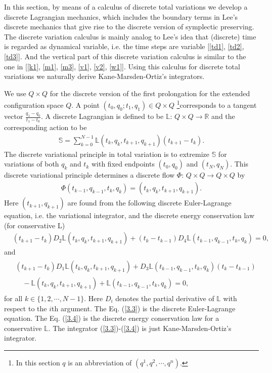 \documentclass[a4paper,a4paper]{article}
\begin{document}
 In this section, by means of a calculus of discrete total variations we develop
 a discrete Lagrangian mechanics, which includes the boundary terms in Lee's
discrete mechanics that give rise to the discrete version of
symplectic preserving. The discrete variation calculus is mainly
analog to Lee's idea that (discrete) time is regarded as dynamical
variable, i.e. the time steps are variable [\ref{td1}, \ref{td2},
\ref{td3}]. And the vertical part of this discrete variation
calculus is similar to the one in [\ref{k1}, \ref{m1}, \ref{m3},
\ref{v1}, \ref{v2}, \ref{w1}]. %
Using this calculus
for discrete total  variations
we  naturally derive
 Kane-Marsden-Ortiz's integrators.

 We use $Q \times Q$ for the discrete version
of the first prolongation for the extended configuration space
$Q$. A point $(t_{0}, q_{0}; t_{1}, q_{1})\in Q\times Q$
{\footnote{In this section $q$ is an abbreviation of
$(q^{1}, q^{2}, \cdots, q^{n})$.}}corresponds to a tangent vector
$\frac{q_{1}-q_{0}}{t_{1}-t_{0}}$. A discrete Lagrangian is
defined to be $\mathbb{L}:\,Q\times Q\to \mathbb{R}$ and the
corresponding action to be
\begin{align}
 \mathbb{S}=\sum_{k=0}^{N-1}\mathbb{L}(t_{k}, q_{k}, t_{k+1}, q_{k+1})
   (t_{k+1}-t_{k}). \label{3.1}
\end{align}
The discrete variational principle in total variation  is to
extremize $\mathbb{S}$ for variations of both $q_{k}$ and $t_{k}$
with  fixed endpoints $(t_{0}, q_{0})$ and $(t_{N}, q_{N})$. This
discrete variational principle  determines a discrete flow
$\Phi:\,Q\times Q\to Q\times Q$ by
\begin{align}
   \Phi(t_{k-1}, q_{k-1}, t_{k}, q_{k})=(t_{k}, q_{k},t_{k+1}, q_{k+1}). \label{3.2}
\end{align}
Here $(t_{k+1}, q_{k+1})$ are found from the following discrete
Euler-Lagrange equation, i.e. the variational integrator, and the
discrete energy conservation law (for conservative L)
\begin{align}
 &(t_{k+1}-t_{k})D_{2}\mathbb{L}(t_{k}, q_{k}, t_{k+1}, q_{k+1})
  +(t_{k}-t_{k-1})D_{4}\mathbb{L}(t_{k-1}, q_{k-1}, t_{k}, q_{k})=0,
 \label{3.3}
\end{align}
and
\begin{align}
 \begin{split}
 &(t_{k+1}-t_{k})D_{1}\mathbb{L}(t_{k}, q_{k}, t_{k+1}, q_{k+1})
   +D_{3}\mathbb{L}(t_{k-1}, q_{k-1}, t_{k}, q_{k})(t_{k}-t_{k-1}) \\
 &\quad -\mathbb{L}(t_{k}, q_{k}, t_{k+1}, q_{k+1})+
\mathbb{L}(t_{k-1}, q_{k-1}, t_{k}, q_{k})=0,
\end{split}\label{3.4}
\end{align}
for all $k\in\{1, 2, \cdots, N-1\}$. Here $D_{i}$ denotes the
partial derivative of $\mathbb{L}$ with respect to the $i$th
argument. The Eq. (\ref{3.3}) is the discrete Euler-Lagrange
equation. %
The Eq. (\ref{3.4}) is the discrete energy conservation law for a
conservative $\mathbb{L}$. The integrator (\ref{3.3})-(\ref{3.4})
is just Kane-Marsden-Ortiz's integrator.
\end{document}
